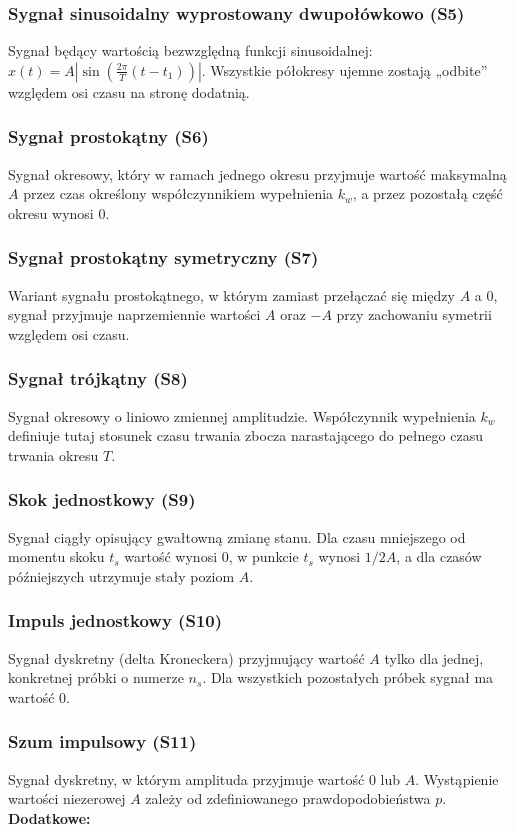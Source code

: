 \documentclass[12pt]{article}
\begin{document}
\subsubsection*{Sygnał sinusoidalny wyprostowany dwupołówkowo (S5)}
Sygnał będący wartością bezwzględną funkcji sinusoidalnej: $x(t)=A |\sin(\frac{2\pi}{T}(t-t_{1}))|$. Wszystkie półokresy ujemne zostają „odbite” względem osi czasu na stronę dodatnią.

\subsubsection*{Sygnał prostokątny (S6)}
Sygnał okresowy, który w ramach jednego okresu przyjmuje wartość maksymalną $A$ przez czas określony współczynnikiem wypełnienia $k_w$, a przez pozostałą część okresu wynosi 0.

\subsubsection*{Sygnał prostokątny symetryczny (S7)}
Wariant sygnału prostokątnego, w którym zamiast przełączać się między $A$ a 0, sygnał przyjmuje naprzemiennie wartości $A$ oraz $-A$ przy zachowaniu symetrii względem osi czasu.

\subsubsection*{Sygnał trójkątny (S8)}
Sygnał okresowy o liniowo zmiennej amplitudzie. Współczynnik wypełnienia $k_w$ definiuje tutaj stosunek czasu trwania zbocza narastającego do pełnego czasu trwania okresu $T$.

\subsubsection*{Skok jednostkowy (S9)}
Sygnał ciągły opisujący gwałtowną zmianę stanu. Dla czasu mniejszego od momentu skoku $t_s$ wartość wynosi 0, w punkcie $t_s$ wynosi $1/2 A$, a dla czasów późniejszych utrzymuje stały poziom $A$.

\subsubsection*{Impuls jednostkowy (S10)}
Sygnał dyskretny (delta Kroneckera) przyjmujący wartość $A$ tylko dla jednej, konkretnej próbki o numerze $n_s$. Dla wszystkich pozostałych próbek sygnał ma wartość 0.

\subsubsection*{Szum impulsowy (S11)}
Sygnał dyskretny, w którym amplituda przyjmuje wartość 0 lub $A$. Wystąpienie wartości niezerowej $A$ zależy od zdefiniowanego prawdopodobieństwa $p$.
\newpage
\textbf{Dodatkowe:}
\end{document}
